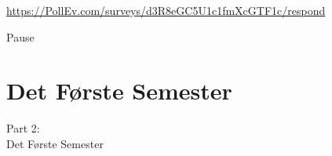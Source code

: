 \documentclass[t, aspectratio=169]{beamer}
\begin{document}
\begin{frame}
  \vspace{4mm}
  \begin{center}
    
    \vspace{2mm}
    \Huge{\url{https://PollEv.com/surveys/d3R8eGC5U1c1fmXcGTF1c/respond}}
  \end{center}
\end{frame}

\begin{frame}
  \vspace{32mm}
  \begin{center}
    \Huge{Pause}
  \end{center}
\end{frame}

\section{Det Første Semester}
\begin{frame}
  \vspace{25mm}
  \begin{center}
    \Huge{Part 2:\\Det Første Semester}
  \end{center}
\end{frame}
\end{document}
